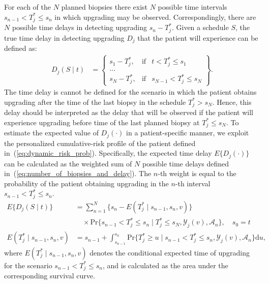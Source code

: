 For each of the $N$ planned biopsies there exist $N$ possible time intervals ${s_{n-1} < T^*_j \leq s_n}$ in which upgrading may be observed. Correspondingly, there are $N$ possible time delays in detecting upgrading $s_n - T^*_j$. Given a schedule $S$, the true time delay in detecting upgrading $D_j$ that the patient will experience can be defined as:
\begin{equation}
\label{eq:number_of_biopsies_and_delay}
\begin{split}
D_j (S \mid t) &= \left\{ \begin{array}{lcrr}
  s_1 - T^*_j, &\mbox{if}& t < T^*_j \leq s_1\\
  \ldots \\
  s_N - T^*_j, &\mbox{if}& s_{N-1} < T^*_j \leq s_N  
\end{array} \right\}.
\end{split}
\end{equation}
The time delay is cannot be defined for the scenario in which the patient obtains upgrading after the time of the last biopsy in the schedule $T^*_j > s_N$. Hence, this delay should be interpreted as the delay that will be observed if the patient will experience upgrading before time of the last planned biopsy at $T^*_j\leq s_N$. To estimate the expected value of $D_j(\cdot)$ in a patient-specific manner, we exploit the personalized cumulative-risk profile of the patient defined in~(\ref{eq:dynamic_risk_prob}). Specifically, the expected time delay $E\{D_j(\cdot)\}$ can be calculated as the weighted sum of $N$ possible time delays defined in~(\ref{eq:number_of_biopsies_and_delay}). The $n$-th weight is equal to the probability of the patient obtaining upgrading in the $n$-th interval ${s_{n-1} < T^*_j \leq s_n}$.
\begin{equation*}
\label{eq:expected_number_of_biopsies_and_delay}
\begin{split}
E\big\{D_j(S \mid t)\big\} &= \sum_{n=1}^{N} \Big\{s_n - E(T^*_j \mid s_{n-1}, s_n, v)\Big\} \\ & \quad \times \mbox{Pr}\Big\{s_{n-1} < T^*_j \leq s_n \mid T^*_j \leq s_N, \mathcal{Y}_j(v), \mathcal{A}_n\Big\}, \quad s_0 = t\\
E(T^*_j \mid s_{n-1}, s_n, v) &= s_{n-1} + \int_{s_{n-1}}^{s_n} \mbox{Pr}\Big\{T^*_j \geq u \mid s_{n-1} < T^*_j \leq s_n, \mathcal{Y}_{j}(v), \mathcal{A}_n\Big\} \mathrm{d}u,
\end{split}
\end{equation*}
where $E(T^*_j \mid s_{n-1}, s_n, v)$ denotes the conditional expected time of upgrading for the scenario $s_{n-1} < T^*_j \leq s_n$, and is calculated as the area under the corresponding survival curve.

